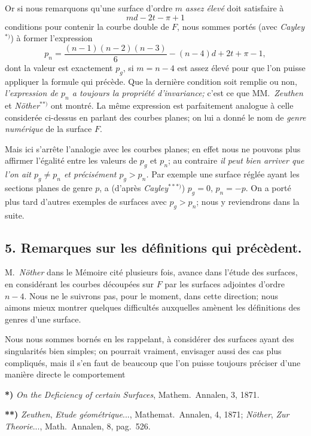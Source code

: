 \documentclass{article}
\begin{document}
Or si nous remarquons qu'une surface d'ordre $m$ \emph{assez élevé} doit satisfaire à
\[ md - 2t - \pi + 1 \]
conditions pour contenir la courbe double de $F$, nous sommes portés (avec \emph{Cayley}${}^{*)}$) à former l'expression
\[ p_{n} = \frac{(n-1)(n-2)(n-3)}{6} - (n-4)d + 2t + \pi - 1, \]
dont la valeur est exactement $p_{g}$, si $m = n - 4$ est assez élevé pour que l'on puisse appliquer la formule qui précède. Que la dernière condition soit remplie ou non, \emph{l'expression de $p_{n}$ a toujours la propriété d'invariance;} c'est ce que MM.\ \emph{Zeuthen} et \emph{Nöther}${}^{**)}$ ont montré. La même expression est parfaitement analogue à celle considerée ci-dessus en parlant des courbes planes; on lui a donné le nom de \emph{genre numérique} de la surface $F$.

Mais ici s'arrête l'analogie avec les courbes planes; en effet nous ne pouvons plus affirmer l'égalité entre les valeurs de $p_{g}$ et $p_{n}$; au contraire \emph{il peut bien arriver que l'on ait $p_{g} \neq p_{n}$ et précisément $p_{g} > p_{n}$.} Par exemple une surface réglée ayant les sections planes de genre $p$, a (d'après \emph{Cayley}${}^{***)}$) $p_{g} = 0$, $p_{n} = -p$. On a porté plus tard d'autres exemples de surfaces avec $p_{g} > p_{n}$; nous y reviendrons dans la suite.

\subsection*{5. Remarques sur les définitions qui précèdent.}

M.\ \emph{Nöther} dans le Mémoire cité plusieurs fois, avance dans l'étude des surfaces, en considérant les courbes découpées sur $F$ par les surfaces adjointes d'ordre $n - 4$. Nous ne le suivrons pas, pour le moment, dans cette direction; nous aimons mieux montrer quelques difficultés auxquelles amènent les définitions des genres d'une surface.

Nous nous sommes bornés en les rappelant, à considérer des surfaces ayant des singularités bien simples; on pourrait vraiment, envisager aussi des cas plus compliqués, mais il s'en faut de beaucoup que l'on puisse toujours préciser d'une manière directe le comportement

\textbf{*)} \emph{On the Deficiency of certain Surfaces}, Mathem.\ Annalen, 3, 1871.

\textbf{**)} \emph{Zeuthen}, \emph{Etude géométrique}..., Mathemat.\ Annalen, 4, 1871; \emph{Nöther}, \emph{Zur Theorie}..., Math.\ Annalen, 8, pag.\ 526.
\end{document}
